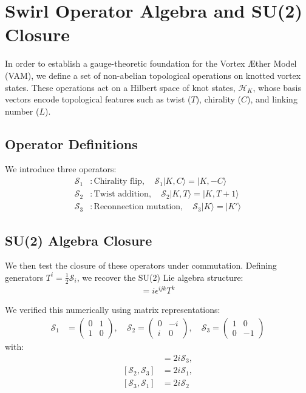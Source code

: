 \section{Swirl Operator Algebra and SU(2) Closure}

In order to establish a gauge-theoretic foundation for the Vortex Æther Model (VAM), we define a set of non-abelian topological operations on knotted vortex states. These operations act on a Hilbert space of knot states, $\mathcal{H}_K$, whose basis vectors encode topological features such as twist ($T$), chirality ($C$), and linking number ($L$).

\subsection*{Operator Definitions}

We introduce three operators:
\begin{align}
\mathcal{S}_1 &: \text{Chirality flip}, \quad \mathcal{S}_1 |K, C\rangle = |K, -C\rangle \\
\mathcal{S}_2 &: \text{Twist addition}, \quad \mathcal{S}_2 |K, T\rangle = |K, T+1\rangle \\
\mathcal{S}_3 &: \text{Reconnection mutation}, \quad \mathcal{S}_3 |K\rangle = |K'\rangle
\end{align}

\subsection*{SU(2) Algebra Closure}

We then test the closure of these operators under commutation. Defining generators $T^i = \frac{1}{2} \mathcal{S}_i$, we recover the SU(2) Lie algebra structure:
\begin{align}
[T^i, T^j] = i \epsilon^{ijk} T^k
\end{align}

We verified this numerically using matrix representations:
\begin{align}
\mathcal{S}_1 &= \begin{pmatrix} 0 & 1 \\ 1 & 0 \end{pmatrix}, \quad
\mathcal{S}_2 = \begin{pmatrix} 0 & -i \\ i & 0 \end{pmatrix}, \quad
\mathcal{S}_3 = \begin{pmatrix} 1 & 0 \\ 0 & -1 \end{pmatrix}
\end{align}
with:
\begin{align}
[\mathcal{S}_1, \mathcal{S}_2] &= 2i \mathcal{S}_3, \\
[\mathcal{S}_2, \mathcal{S}_3] &= 2i \mathcal{S}_1, \\
[\mathcal{S}_3, \mathcal{S}_1] &= 2i \mathcal{S}_2
\end{align}


